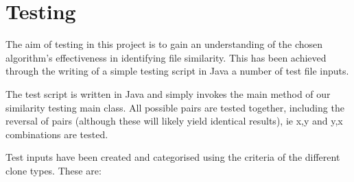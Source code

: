 \section{Testing}
The aim of testing in this project is to gain an understanding of the chosen algorithm's effectiveness in identifying file similarity. This has been achieved through the writing of a simple testing script in Java a number of test file inputs.

The test script is written in Java and simply invokes the main method of our similarity testing main class. All possible pairs are tested together, including the reversal of pairs (although these will likely yield identical results), ie x,y and y,x combinations are tested.  

Test inputs have been created and categorised using the criteria of the different clone types. These are:
\begin{itemize}

\end{itemize}

\break
